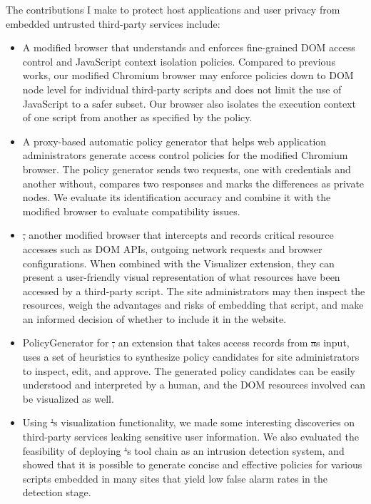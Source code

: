 \vspace*{8pt}The contributions I make to protect host applications and user privacy from embedded untrusted third-party services include:

\begin{itemize}

\item A modified browser that understands and enforces fine-grained DOM access control and JavaScript context isolation policies.  Compared to previous works, our modified Chromium browser may enforce policies down to DOM node level for individual third-party scripts and does not limit the use of JavaScript to a safer subset.  Our browser also isolates the execution context of one script from another as specified by the policy.  

\item A proxy-based automatic policy generator that helps web application administrators generate access control policies for the modified Chromium browser.  The policy generator sends two requests, one with credentials and another without, compares two responses and marks the differences as private nodes.  We evaluate its identification accuracy and combine it with the modified browser to evaluate compatibility issues.

\item \st, another modified browser that intercepts and records critical resource accesses such as DOM APIs, outgoing network requests and browser configurations.  When combined with the Visualizer extension, they can present a user-friendly visual representation of what resources have been accessed by a third-party script.  The site administrators may then inspect the resources, weigh the advantages and risks of embedding that script, and make an informed decision of whether to include it in the website.

\item PolicyGenerator for \st, an extension that takes access records from \st as input, uses a set of heuristics to synthesize policy candidates for site administrators to inspect, edit, and approve.  The generated policy candidates can be easily understood and interpreted by a human, and the DOM resources involved can be visualized as well.

\item Using \st's visualization functionality, we made some interesting discoveries on third-party services leaking sensitive user information.  We also evaluated the feasibility of deploying \st's tool chain as an intrusion detection system, and showed that it is possible to generate concise and effective policies for various scripts embedded in many sites that yield low false alarm rates in the detection stage.

\end{itemize}